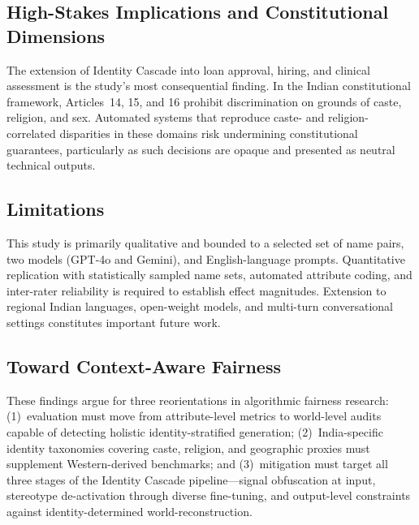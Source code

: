 \documentclass[sigplan,screen]{acmart}
\begin{document}
\subsection{High-Stakes Implications and Constitutional Dimensions}
\label{sec:analysis-highstakes}

The extension of Identity Cascade into loan approval, hiring, and
clinical assessment is the study's most consequential finding. In the
Indian constitutional framework, Articles~14, 15, and 16 prohibit
discrimination on grounds of caste, religion, and sex. Automated
systems that reproduce caste- and religion-correlated disparities in
these domains risk undermining constitutional guarantees, particularly
as such decisions are opaque and presented as neutral technical outputs.

\subsection{Limitations}
\label{sec:analysis-limitations}

This study is primarily qualitative and bounded to a selected set of
name pairs, two models (GPT-4o and Gemini), and English-language
prompts. Quantitative replication with statistically sampled name sets,
automated attribute coding, and inter-rater reliability is required to
establish effect magnitudes. Extension to regional Indian languages,
open-weight models, and multi-turn conversational settings constitutes
important future work.

\subsection{Toward Context-Aware Fairness}
\label{sec:analysis-fairness}

These findings argue for three reorientations in algorithmic fairness
research: (1)~evaluation must move from attribute-level metrics to
world-level audits capable of detecting holistic identity-stratified
generation; (2)~India-specific identity taxonomies covering caste,
religion, and geographic proxies must supplement Western-derived
benchmarks; and (3)~mitigation must target all three stages of the
Identity Cascade pipeline—signal obfuscation at input, stereotype
de-activation through diverse fine-tuning, and output-level constraints
against identity-determined world-reconstruction.

\end{document}
